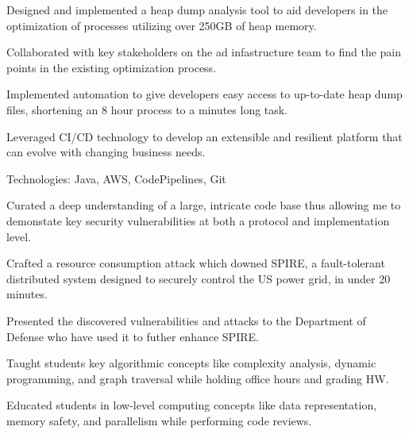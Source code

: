 \documentclass[]{deedy-resume-openfont}
\begin{document}
\qquad\qquad\qquad\qquad\quad {}
\begin{tightemize}
    \item Designed and implemented a heap dump analysis tool to aid developers in the
    optimization of processes utilizing over 250GB of heap memory.
    \item Collaborated with key stakeholders on the ad infastructure team
    to find the pain points in the existing optimization process.
    \item Implemented automation to give developers easy access to up-to-date 
    heap dump files, shortening an 8 hour process to a minutes long task.
    \item Leveraged CI/CD technology to develop an extensible
    and resilient platform that can evolve with changing business needs.
    \item Technologies: Java, AWS, CodePipelines, Git
    \end{tightemize}
\sectionsep

 \href{http://www.dsn.jhu.edu/courses/cs310/power-grid/}{\faExternalLink}
\begin{tightemize}
    \item Curated a deep understanding of a large, intricate code base thus allowing me
    to demonstate key security vulnerabilities at both a protocol and implementation level.
    \item Crafted a resource consumption attack which downed SPIRE, a fault-tolerant 
    distributed system designed to securely control the US power grid, in under 20 minutes.
    \item Presented the discovered vulnerabilities and attacks to the Department of Defense
    who have used it to futher enhance SPIRE.
\end{tightemize}
\sectionsep

\qquad {}
\begin{tightemize}
    \item Taught students key algorithmic concepts like complexity analysis, 
    dynamic programming, and graph traversal while holding office hours and grading HW.
    \item Educated students in low-level computing concepts like data representation, 
    memory safety, and parallelism while performing code reviews.
\end{tightemize}
\sectionsep
\end{document}
